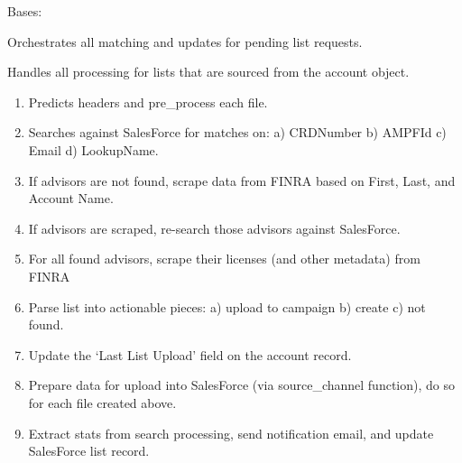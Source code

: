 \documentclass[letterpaper,10pt,english]{sphinxmanual}
\begin{document}
\begin{fulllineitems}
\label{\detokenize{index:ListManagement.list_processing.ListProcessing}}
Bases: 

Orchestrates all matching and updates for pending list requests.

\begin{fulllineitems}
\label{\detokenize{index:ListManagement.list_processing.ListProcessing.account_processing}}
Handles all processing for lists that are sourced from the account object.
\begin{enumerate}
\def\theenumi{\arabic{enumi}}
\def\labelenumi{\theenumi )}
\makeatletter\def\p@enumii{\p@enumi \theenumi )}\makeatother
\item {} 
Predicts headers and pre\_process each file.

\item {} 
Searches against SalesForce for matches on: a) CRDNumber b) AMPFId c) Email d) LookupName.

\item {} 
If advisors are not found, scrape data from FINRA based on First, Last, and Account Name.

\item {} 
If advisors are scraped, re-search those advisors against SalesForce.

\item {} 
For all found advisors, scrape their licenses (and other metadata) from FINRA

\item {} 
Parse list into actionable pieces: a) upload to campaign b) create c) not found.

\item {} 
Update the ‘Last List Upload’ field on the account record.

\item {} 
Prepare data for upload into SalesForce (via source\_channel function), do so for each file created above.

\item {} 
Extract stats from search processing, send notification email, and update SalesForce list record.


\end{enumerate}
\end{fulllineitems}
\end{fulllineitems}
\end{document}
